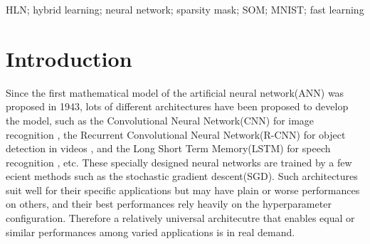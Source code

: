 \documentclass[3p,times,procedia]{elsarticle}
\begin{document}
\begin{frontmatter}
\begin{keyword}
HLN; hybrid learning; neural network; sparsity mask; SOM; MNIST; fast learning




\end{keyword}

\end{frontmatter}



\section{Introduction}
\label{main}
Since the first mathematical model 
of the artificial neural network(ANN) was 
proposed in 
1943\cite{mcculloch1943logical}, 
lots of different architectures 
have been proposed
to develop the model, such as 
the Convolutional Neural Network(CNN) 
for image recognition
\cite{krizhevsky2012imagenet}, 
the Recurrent Convolutional Neural 
Network(R-CNN) for object 
detection in videos
\cite{girshick2015fast}, 
and the Long Short Term Memory(LSTM)
for speech recognition
\cite{graves2013hybrid}, etc. 
These specially designed neural 
networks are trained by 
a few ecient methods such as
the stochastic gradient 
descent(SGD)\cite{bottou2010large}. 
Such architectures
suit well for their specific 
applications but may have plain 
or worse performances on others, 
and their best performances 
rely heavily on the hyperparameter 
configuration. Therefore
a relatively universal 
architecutre that enables equal 
or similar performances among 
varied applications is in real demand.
\end{document}
